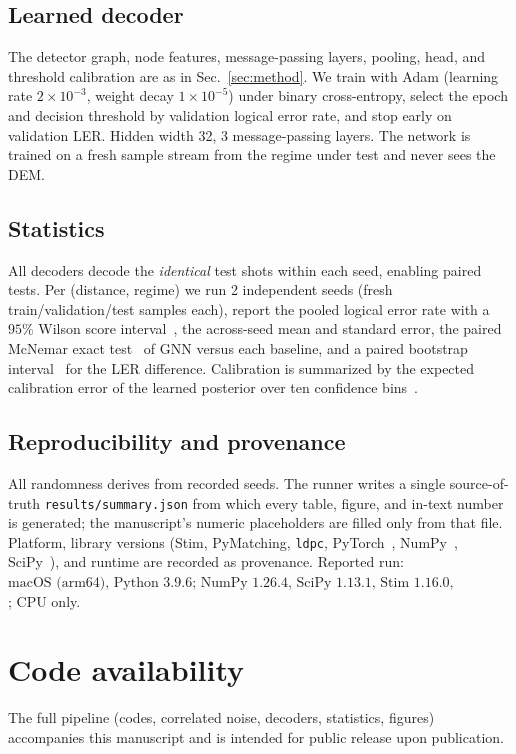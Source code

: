 \documentclass[aps,prxquantum,twocolumn,superscriptaddress,nofootinbib,longbibliography]{revtex4-2}
\newcommand{\res}[1]{#1}
\begin{document}
\subsection{Learned decoder}
The detector graph, node features, message-passing layers, pooling, head, and
threshold calibration are as in Sec.~\ref{sec:method}. We train with Adam
(learning rate $\res{2\times10^{-3}}$, weight decay $\res{1\times10^{-5}}$) under binary cross-entropy, select
the epoch and decision threshold by validation logical error rate, and stop early
on validation LER. Hidden width 32, 3 message-passing layers.
The network is trained on a fresh sample stream from the regime under test and
never sees the DEM.

\subsection{Statistics}
All decoders decode the \emph{identical} test shots within each seed, enabling
paired tests. Per (distance, regime) we run 2 independent seeds (fresh
train/validation/test samples each), report the pooled logical error rate with a
$95\%$ Wilson score interval~\cite{wilson1927probable}, the across-seed mean and
standard error, the paired McNemar exact test~\cite{mcnemar1947note} of GNN versus
each baseline, and a paired bootstrap interval~\cite{efron1979bootstrap}
for the LER difference. Calibration is summarized by the expected calibration
error of the learned posterior over ten confidence bins~\cite{guo2017calibration}.

\subsection{Reproducibility and provenance}
All randomness derives from recorded seeds. The runner writes a single
source-of-truth \texttt{results/summary.json} from which every table, figure, and
in-text number is generated; the manuscript's numeric placeholders are filled
only from that file. Platform, library versions (Stim, PyMatching, \texttt{ldpc},
PyTorch~\cite{paszke2019pytorch}, NumPy~\cite{harris2020array},
SciPy~\cite{virtanen2020scipy}), and runtime are recorded as provenance. Reported run:
$\res{\text{macOS (arm64), Python 3.9.6; NumPy 1.26.4, SciPy 1.13.1, Stim 1.16.0,
PyMatching 2.4.0, ldpc 2.3.9, PyTorch 2.8.0}}$; CPU only.

\section*{Code availability}
The full pipeline (codes, correlated noise, decoders, statistics, figures)
accompanies this manuscript and is intended for public release upon publication.
\end{document}
